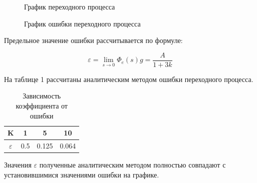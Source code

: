 \documentclass[a4paper, 11pt]{article}
\begin{document}
\begin{figure}[h!]
    \caption{График переходного процесса}
    \label{two}
\end{figure}



\begin{figure}[h!]
    \caption{График ошибки переходного процесса}
    \label{tree}
\end{figure}


Предельное значение ошибки рассчитывается по формуле:

\begin{equation}
	\varepsilon = \lim_{s\to 0}{\Phi_e(s)}g =\frac {A}{1+3k}
\end{equation}

На таблице 1 рассчитаны аналитическим методом ошибки переходного процесса.

\newpage

\begin{table}[h]
		\caption{Зависимость коэффициента от ошибки}
		\begin{tabular}{|c|c|c|c|}
			\hline
			K & 1 & 5 & 10 \\
			\hline
			$\varepsilon$ & 0.5 & 0.125 & 0.064 \\
			\hline     
		\end{tabular}
		
		\label{tab:my_label}
\end{table}

Значения $\varepsilon$ полученные аналитическим методом полностью совпадают с установившимися значениями ошибки на графике.
\end{document}

